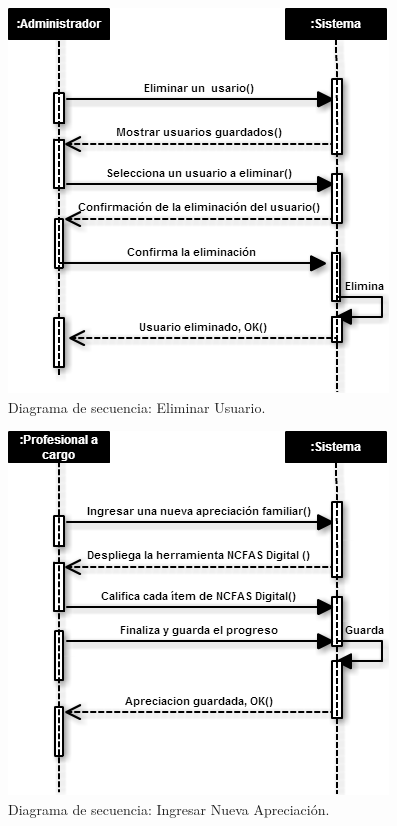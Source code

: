 \begin{figure}[htb]
	\label{dss3}
	\begin{center}
		\includegraphics[scale=0.5]{imagenes/eliminaruser.png}
	\end{center}
	\caption{Diagrama de secuencia: Eliminar Usuario.}
\end{figure}


\begin{figure}[htb]
	\label{dss4}
	\begin{center}
		\includegraphics[scale=0.5]{imagenes/ingresarncfas.png}
	\end{center}
	\caption{Diagrama de secuencia: Ingresar Nueva Apreciación.}
\end{figure}


